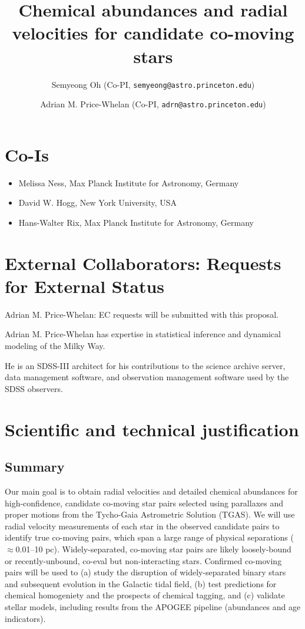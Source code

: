 \documentclass[11pt]{article}
\title{\bf Chemical abundances and radial velocities for candidate co-moving
stars}
\author{
  Semyeong Oh (Co-PI, \texttt{semyeong@astro.princeton.edu})
  \and
  Adrian M. Price-Whelan (Co-PI, \texttt{adrn@astro.princeton.edu})
}
\date{}
\begin{document}
\maketitle

\section*{Co-Is}

\begin{itemize}
    \item Melissa Ness, Max Planck Institute for Astronomy, Germany
    \item David W. Hogg, New York University, USA
    \item Hans-Walter Rix, Max Planck Institute for Astronomy, Germany
\end{itemize}

\section*{External Collaborators: Requests for External Status}

Adrian M. Price-Whelan: EC requests will be submitted with this proposal.

Adrian M. Price-Whelan has expertise in statistical inference and dynamical
modeling of the Milky Way.

He is an SDSS-III architect for his contributions to the
science archive server, data management software, and observation management
software used by the SDSS observers.

\section{Scientific and technical justification}

\subsection{Summary}

Our main goal is to obtain radial velocities and detailed chemical abundances
for high-confidence, candidate co-moving star pairs selected using parallaxes
and proper motions from the Tycho-Gaia Astrometric Solution (TGAS).
We will use radial velocity measurements of each star in the observed candidate
pairs to identify true co-moving pairs, which span a large range of physical
separations ($\approx$0.01--10 pc).
Widely-separated, co-moving star pairs are likely loosely-bound or
recently-unbound, co-eval but non-interacting stars.
Confirmed co-moving pairs will be used to (a) study the disruption of
widely-separated binary stars and subsequent evolution in the Galactic tidal
field, (b) test predictions for chemical homogeniety and the prospects of
chemical tagging, and (c) validate stellar models, including results from
the APOGEE pipeline (abundances and age indicators).
\end{document}
